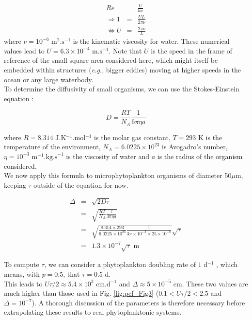 \begin{eqnarray}
 Re & = &\frac{U}{k\nu}\\
\Rightarrow 1 & = & \frac{UL}{2\pi\nu}\\
\Leftrightarrow U & = &\frac{2\pi\nu}{L}
\end{eqnarray}
% 
where $\nu=10^{-6} \text{ m}^{2}.\text{s}^{-1}$ is the kinematic viscosity for water. These numerical values lead to $U=6.3\times10^{-4} \text{ m.s}^{-1}$. Note that $U$ is the speed in the frame of reference of the small square area considered here, which might itself be embedded within structures (\textit{e.g.}, bigger eddies) moving at higher speeds in the ocean or any large waterbody.\\

To determine the diffusivity of small organisms, we can use the Stokes-Einstein equation \citep{einstein1905molekularkinetischen}:

{\color{blue}
\begin{equation}
 D=\frac{RT}{N_{A}}\frac{1}{6\pi\eta a}
\end{equation}
 }

where $R=8.314$ J.K$^{-1}$.mol$^{-1}$ is the molar gas constant, $T=293$ K is the temperature of the environment, $N_{A}=6.0225\times10^{23}$ is Avogadro's number, $\eta=10^{-3}\text{ m}^{-1}.\text{kg.s}^{-1}$ is the viscosity of water and $a$ is the radius of the organism considered.\\

We now apply this formula to microphytoplankton organisms of diameter 50$\mu$m, keeping $\tau$ outside of the equation for now.

\begin{eqnarray}
\Delta & = & \sqrt{2D\tau}\\
  &= & \sqrt{\frac{RT}{N_{A}}\frac{\tau}{3\pi\eta a}}\\
&=& \sqrt{\frac{8.314\times293}{6.0225\times10^{23}}\frac{1}{3\pi\times10^{-3}\times25\times10^{-6}}}\sqrt{\tau}\\
 & = & 1.3 \times 10^{-7} \sqrt{\tau} \text{ m}
\end{eqnarray}

To compute $\tau$, we can consider a phytoplankton doubling rate of $1$ d$^{-1}$ \citep{bissinger_predicting_2008}, which means, with $p=0.5$, that $\tau=0.5$ d.\\

This leads to $U\tau/2\approx 5.4\times10^{3} \text{ cm.d}^{-1}$ and $\Delta \approx 5\times10^{-5}$ cm. These two values are much higher than those used in Fig. \ref{fig:pcf_Fig3} ($0.1<U\tau/2<2.5$ and $\Delta=10^{-7}$). A thorough discussion of the parameters is therefore necessary before extrapolating these results to real phytoplanktonic systems. \\

